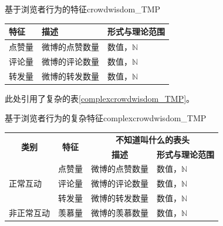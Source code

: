 \documentclass[a4paper,AutoFakeBold,oneside,12pt]{book}
\begin{document}
\begin{bupttable}{基于浏览者行为的特征}{crowdwisdom_TMP}

    \begin{tabular}{l|l|l}
		\hline \textbf{特征} & \textbf{描述} & \textbf{形式与理论范围}\\
		\hline 点赞量 & 微博的点赞数量 & 数值，$\mathbb{N}$ \\
		\hline 评论量 & 微博的评论数量 & 数值，$\mathbb{N}$ \\
		\hline 转发量 & 微博的转发数量 & 数值，$\mathbb{N}$ \\
		\hline
    \end{tabular}
\end{bupttable}

此处引用了复杂的表\ref{complexcrowdwisdom_TMP}。


\begin{bupttable}{基于浏览者行为的复杂特征}{complexcrowdwisdom_TMP}
    \begin{tabular}{l|l|l|l}
        \hline
        \multicolumn{1}{c|}{\multirow{2}{*}{\textbf{类别}}} & \multicolumn{1}{c|}{\multirow{2}{*}{\textbf{特征}}} & \multicolumn{2}{c}{\textbf{不知道叫什么的表头}} \\
        \cline{3-4}
        & & \multicolumn{1}{c|}{\textbf{描述}} & \multicolumn{1}{c}{\textbf{形式与理论范围}} \\
        \hline
        \multirow{3}{*}{正常互动} & 点赞量 & 微博的点赞数量 & 数值，$\mathbb{N}$ \\
        \cline{2-4}
        & 评论量 & 微博的评论数量 & 数值，$\mathbb{N}$ \\
        \cline{2-4}
        & 转发量 & 微博的转发数量 & 数值，$\mathbb{N}$ \\
        \hline
        非正常互动 & 羡慕量 & 微博的羡慕数量 & 数值，$\mathbb{N}$ \\
        \hline
    \end{tabular}
\end{bupttable}
\end{document}
